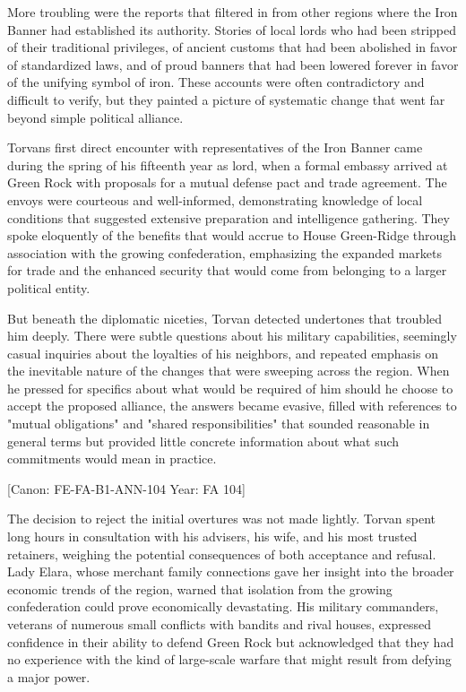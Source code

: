 More troubling were the reports that filtered in from other regions
where the Iron Banner had established its authority. Stories of local
lords who had been stripped of their traditional privileges, of ancient
customs that had been abolished in favor of standardized laws, and of
proud banners that had been lowered forever in favor of the unifying
symbol of iron. These accounts were often contradictory and difficult to
verify, but they painted a picture of systematic change that went far
beyond simple political alliance.

Torvan\textquotesingle s first direct encounter with representatives of
the Iron Banner came during the spring of his fifteenth year as lord,
when a formal embassy arrived at Green Rock with proposals for a mutual
defense pact and trade agreement. The envoys were courteous and
well-informed, demonstrating knowledge of local conditions that
suggested extensive preparation and intelligence gathering. They spoke
eloquently of the benefits that would accrue to House Green-Ridge
through association with the growing confederation, emphasizing the
expanded markets for trade and the enhanced security that would come
from belonging to a larger political entity.

But beneath the diplomatic niceties, Torvan detected undertones that
troubled him deeply. There were subtle questions about his military
capabilities, seemingly casual inquiries about the loyalties of his
neighbors, and repeated emphasis on the inevitable nature of the changes
that were sweeping across the region. When he pressed for specifics
about what would be required of him should he choose to accept the
proposed alliance, the answers became evasive, filled with references to
"mutual obligations" and "shared responsibilities" that sounded
reasonable in general terms but provided little concrete information
about what such commitments would mean in practice.

{[}Canon: FE-FA-B1-ANN-104 \textbar{} Year: FA 104{]}

The decision to reject the initial overtures was not made lightly.
Torvan spent long hours in consultation with his advisers, his wife, and
his most trusted retainers, weighing the potential consequences of both
acceptance and refusal. Lady Elara, whose merchant family connections
gave her insight into the broader economic trends of the region, warned
that isolation from the growing confederation could prove economically
devastating. His military commanders, veterans of numerous small
conflicts with bandits and rival houses, expressed confidence in their
ability to defend Green Rock but acknowledged that they had no
experience with the kind of large-scale warfare that might result from
defying a major power.

